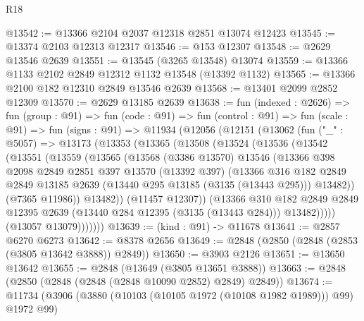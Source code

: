 \begin{lexlean}{R18}
\begin{coremodule}
@13542 := @13366 @2104 @2037 @12318 @2851 @13074 @12423
@13545 := @13374 @2103 @12313 @12317
@13546 := @153 @12307
@13548 := @2629 @13546 @2639
@13551 := @13545 (@3265 @13548) @13074
@13559 := @13366 @1133 @2102 @2849 @12312 @1132 @13548 (@13392 @1132)
@13565 := @13366 @2100 @182 @12310 @2849 @13546 @2639
@13568 := @13401 @2099 @2852 @12309
@13570 := @2629 @13185 @2639
@13638 := fun (indexed : @2626) =>
  fun (group : @91) =>
  fun (code : @91) =>
  fun (control : @91) =>
  fun (scale : @91) =>
  fun (signs : @91) =>
  @11934
    (@12056
      (@12151
        (@13062
          (fun ("_" : @5057) =>
          @13173
            (@13353
              (@13365
                (@13508
                  (@13524
                    (@13536
                      (@13542
                        (@13551
                          (@13559
                            (@13565
                              (@13568
                                (@3386 @13570)
                                @13546
                                (@13366
                                  @398
                                  @2098
                                  @2849
                                  @2851
                                  @397
                                  @13570
                                  (@13392 @397)
                                  (@13366
                                    @316
                                    @182
                                    @2849
                                    @2849
                                    @13185
                                    @2639
                                    (@13440 @295 @13185 (@3135 (@13443 @295)))
                                    @13482))
                                (@7365 @11986))
                              @13482))
                          (@11457 @12307))
                        (@13366
                          @310
                          @182
                          @2849
                          @2849
                          @12395
                          @2639
                          (@13440 @284 @12395 (@3135 (@13443 @284)))
                          @13482)))))
                (@13057 @13079)))))))
@13639 := (kind : @91) -> @11678
@13641 := @2857 @6270 @6273
@13642 := @8378 @2656
@13649 := @2848 (@2850 (@2848 (@2853 (@3805 @13642 @3888)) @2849))
@13650 := @3903 @2126
@13651 := @13650 @13642
@13655 := @2848 (@13649 (@3805 @13651 @3888))
@13663 := @2848 (@2850 (@2848 (@2848 (@2848 @10090 @2852) @2849) @2849))
@13674 := @11734 (@3906 (@3880 (@10103 (@10105 @1972 (@10108 @1982 @1989))) @99) @1972 @99)

\end{coremodule}
\end{lexlean}
